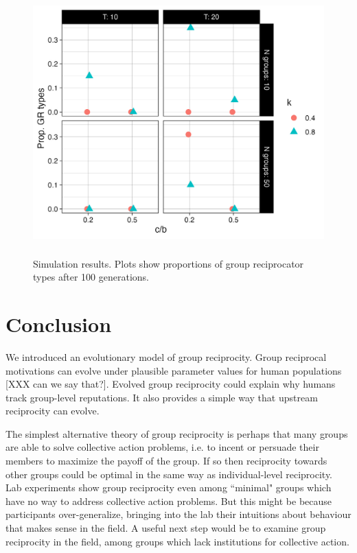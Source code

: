 \documentclass[12pt,a4paper]{article}
\begin{document}
\begin{figure}[h]
  \caption{Simulation results. Plots show proportions of group reciprocator types after 100 generations.}
  \label{fig:sims}
  \centering
    \includegraphics[height=4in]{R files/basic-experiment.jpeg}
\end{figure}

\section{Conclusion}

We introduced an evolutionary model of group reciprocity. Group reciprocal 
motivations can evolve under plausible parameter values for human populations 
[XXX can we say that?]. Evolved group reciprocity could explain why humans
track group-level reputations. It also provides a simple way that upstream
reciprocity can evolve. 

The simplest alternative theory of group reciprocity is perhaps that many groups
are able to solve collective action problems, i.e. to incent or persuade
their members to maximize the payoff of the group. If so then reciprocity 
towards other groups could be optimal in the same way as individual-level
reciprocity. Lab experiments show group reciprocity even among ``minimal" groups 
which have no way to address collective action problems. But this might be
because participants over-generalize, bringing into the lab their intuitions 
about behaviour that makes sense in the field. A useful next step would be to
examine group reciprocity in the field, among groups which lack institutions
for collective action.
\end{document}
